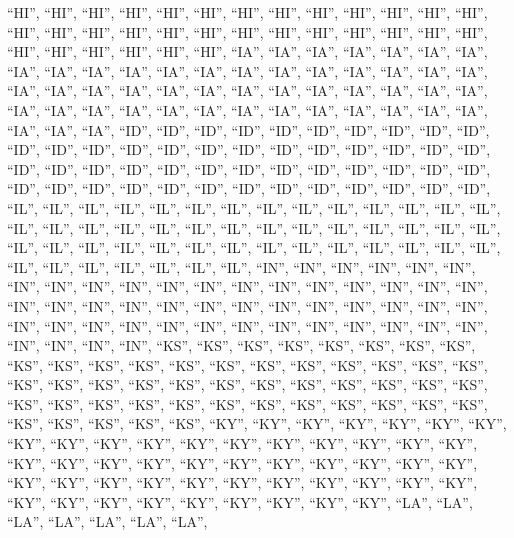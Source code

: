 \documentclass[
]{article}
\begin{document}
``HI'', ``HI'', ``HI'', ``HI'', ``HI'', ``HI'', ``HI'', ``HI'', ``HI'',
``HI'', ``HI'', ``HI'', ``HI'', ``HI'', ``HI'', ``HI'', ``HI'', ``HI'',
``HI'', ``HI'', ``HI'', ``HI'', ``HI'', ``HI'', ``HI'', ``HI'', ``HI'',
``HI'', ``HI'', ``HI'', ``HI'', ``HI'', ``IA'', ``IA'', ``IA'', ``IA'',
``IA'', ``IA'', ``IA'', ``IA'', ``IA'', ``IA'', ``IA'', ``IA'', ``IA'',
``IA'', ``IA'', ``IA'', ``IA'', ``IA'', ``IA'', ``IA'', ``IA'', ``IA'',
``IA'', ``IA'', ``IA'', ``IA'', ``IA'', ``IA'', ``IA'', ``IA'', ``IA'',
``IA'', ``IA'', ``IA'', ``IA'', ``IA'', ``IA'', ``IA'', ``IA'', ``IA'',
``IA'', ``IA'', ``IA'', ``IA'', ``IA'', ``IA'', ``IA'', ``IA'', ``IA'',
``ID'', ``ID'', ``ID'', ``ID'', ``ID'', ``ID'', ``ID'', ``ID'', ``ID'',
``ID'', ``ID'', ``ID'', ``ID'', ``ID'', ``ID'', ``ID'', ``ID'', ``ID'',
``ID'', ``ID'', ``ID'', ``ID'', ``ID'', ``ID'', ``ID'', ``ID'', ``ID'',
``ID'', ``ID'', ``ID'', ``ID'', ``ID'', ``ID'', ``ID'', ``ID'', ``ID'',
``ID'', ``ID'', ``ID'', ``ID'', ``ID'', ``ID'', ``ID'', ``ID'', ``ID'',
``ID'', ``ID'', ``ID'', ``ID'', ``IL'', ``IL'', ``IL'', ``IL'', ``IL'',
``IL'', ``IL'', ``IL'', ``IL'', ``IL'', ``IL'', ``IL'', ``IL'', ``IL'',
``IL'', ``IL'', ``IL'', ``IL'', ``IL'', ``IL'', ``IL'', ``IL'', ``IL'',
``IL'', ``IL'', ``IL'', ``IL'', ``IL'', ``IL'', ``IL'', ``IL'', ``IL'',
``IL'', ``IL'', ``IL'', ``IL'', ``IL'', ``IL'', ``IL'', ``IL'', ``IL'',
``IL'', ``IL'', ``IL'', ``IL'', ``IL'', ``IL'', ``IL'', ``IL'', ``IN'',
``IN'', ``IN'', ``IN'', ``IN'', ``IN'', ``IN'', ``IN'', ``IN'', ``IN'',
``IN'', ``IN'', ``IN'', ``IN'', ``IN'', ``IN'', ``IN'', ``IN'', ``IN'',
``IN'', ``IN'', ``IN'', ``IN'', ``IN'', ``IN'', ``IN'', ``IN'', ``IN'',
``IN'', ``IN'', ``IN'', ``IN'', ``IN'', ``IN'', ``IN'', ``IN'', ``IN'',
``IN'', ``IN'', ``IN'', ``IN'', ``IN'', ``IN'', ``IN'', ``IN'', ``IN'',
``IN'', ``IN'', ``IN'', ``KS'', ``KS'', ``KS'', ``KS'', ``KS'', ``KS'',
``KS'', ``KS'', ``KS'', ``KS'', ``KS'', ``KS'', ``KS'', ``KS'', ``KS'',
``KS'', ``KS'', ``KS'', ``KS'', ``KS'', ``KS'', ``KS'', ``KS'', ``KS'',
``KS'', ``KS'', ``KS'', ``KS'', ``KS'', ``KS'', ``KS'', ``KS'', ``KS'',
``KS'', ``KS'', ``KS'', ``KS'', ``KS'', ``KS'', ``KS'', ``KS'', ``KS'',
``KS'', ``KS'', ``KS'', ``KS'', ``KS'', ``KS'', ``KS'', ``KY'', ``KY'',
``KY'', ``KY'', ``KY'', ``KY'', ``KY'', ``KY'', ``KY'', ``KY'', ``KY'',
``KY'', ``KY'', ``KY'', ``KY'', ``KY'', ``KY'', ``KY'', ``KY'', ``KY'',
``KY'', ``KY'', ``KY'', ``KY'', ``KY'', ``KY'', ``KY'', ``KY'', ``KY'',
``KY'', ``KY'', ``KY'', ``KY'', ``KY'', ``KY'', ``KY'', ``KY'', ``KY'',
``KY'', ``KY'', ``KY'', ``KY'', ``KY'', ``KY'', ``KY'', ``KY'', ``KY'',
``KY'', ``KY'', ``LA'', ``LA'', ``LA'', ``LA'', ``LA'', ``LA'', ``LA'',
\end{document}
